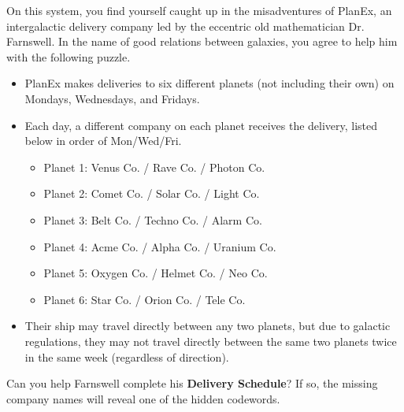 On this system, you find yourself caught up in the misadventures of
PlanEx, an
intergalactic delivery company led by the eccentric old mathematician
Dr. Farnswell. In the name of good relations between galaxies, you
agree to help him with the following puzzle. 

\begin{itemize}
\item PlanEx makes deliveries
to six different planets (not including their own) on Mondays, Wednesdays,
and Fridays. 
\item Each day, a different company on each planet receives the
delivery, listed below in order of Mon/Wed/Fri.
\begin{itemize}
\item Planet 1: Venus Co. / Rave Co. / Photon Co.
\item Planet 2: Comet Co. / Solar Co. / Light Co.
\item Planet 3: Belt Co. / Techno Co. / Alarm Co.
\item Planet 4: Acme Co. / Alpha Co. / Uranium Co.
\item Planet 5: Oxygen Co. / Helmet Co. / Neo Co.
\item Planet 6: Star Co. / Orion Co. / Tele Co.
\end{itemize}
\item Their ship may travel directly between any two planets,
  but due to galactic regulations, they may not travel directly
  between the same two planets twice in the same week (regardless
  of direction).
\end{itemize}

Can you help Farnswell complete his \textbf{Delivery Schedule}? If so,
the missing company names will reveal one of the hidden codewords. 

\begin{center}
\end{center} 
